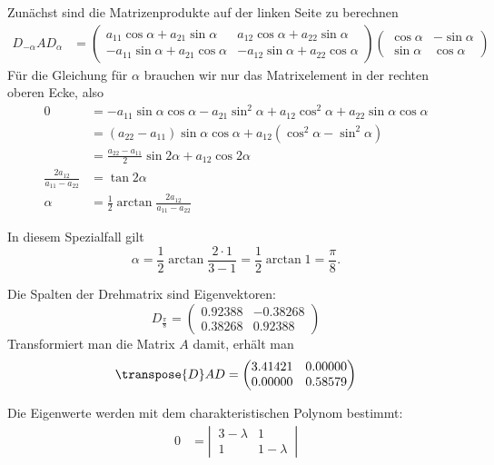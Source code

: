 \begin{loesung}
\begin{teilaufgaben}
\item Zunächst sind die Matrizenprodukte auf der linken Seite zu berechnen
\begin{align*}
D_{-\alpha}AD_{\alpha}
&=
\begin{pmatrix}
 a_{11}\cos\alpha+a_{21}\sin\alpha & a_{12}\cos\alpha + a_{22}\sin\alpha\\
-a_{11}\sin\alpha+a_{21}\cos\alpha &-a_{12}\sin\alpha + a_{22}\cos\alpha
\end{pmatrix}
\begin{pmatrix}
 \cos\alpha&-\sin\alpha\\
 \sin\alpha& \cos\alpha
\end{pmatrix}
\end{align*}
Für die Gleichung für $\alpha$ brauchen wir nur das Matrixelement
in der rechten oberen Ecke, also
\begin{align*}
0
&=
-a_{11}\sin\alpha\cos\alpha -a_{21}\sin^2\alpha+a_{12}\cos^2\alpha+a_{22}\sin\alpha\cos\alpha
\\
&=
(a_{22}-a_{11})\sin\alpha\cos\alpha+a_{12}(\cos^2\alpha-\sin^2\alpha)
\\
&=
\frac{a_{22}-a_{11}}2\sin2\alpha +a_{12}\cos 2\alpha
\\
\frac{2a_{12}}{a_{11}-a_{22}}
&=
\tan2\alpha
\\
\alpha&=\frac12\arctan\frac{2a_{12}}{a_{11}-a_{22}}
\end{align*}
\item
In diesem Spezialfall gilt
\[
\alpha=\frac12\arctan\frac{2\cdot 1}{3 - 1}=\frac12\arctan 1=\frac{\pi}8.
\]
\item
Die Spalten der Drehmatrix sind Eigenvektoren:
\[
D_{\frac{\pi}8}=\begin{pmatrix}
   0.92388& -0.38268\\
   0.38268&  0.92388
\end{pmatrix}
\]
Transformiert man die Matrix $A$ damit, erhält man
\[
\transpose{D}AD=
\begin{pmatrix}
   3.41421&  0.00000\\
   0.00000&  0.58579
\end{pmatrix}
\]
\item
Die Eigenwerte werden mit dem charakteristischen Polynom bestimmt:
\begin{align*}
0&=\left|\,\begin{matrix}3-\lambda&1\\1&1-\lambda\end{matrix}\,\right|

\end{align*}
\end{teilaufgaben}
\end{loesung}
